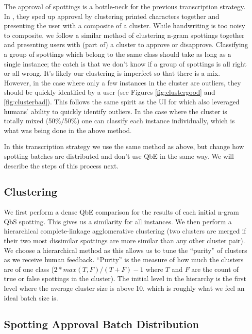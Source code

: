 \documentclass[ms,electronic,twosidetoc,letterpaper,chaptercenter,parttop,lof,lot]{byumsphd}
\begin{document}
The approval of spottings is a bottle-neck for the previous transcription strategy. In \cite{Retsinas2015}, they sped up approval by clustering printed characters together and presenting the user with a composite of a cluster. While handwriting is too noisy to composite, we follow a similar method of clustering n-gram spottings together and presenting users with (part of) a cluster to approve or disapprove. Classifying a group of spottings which belong to the same class should take as long as a single instance; the catch is that we don't know if a group of spottings is all right or all wrong. It's likely our clustering is imperfect so that there is a mix. However, in the case where only a few instances in the cluster are outliers, they should be quickly identified by a user (see Figures \ref{fig:clustergood} and \ref{fig:clusterbad}). This follows the same spirit as the UI for \cite{Clawson2014} which also leveraged humans' ability to quickly identify outliers. In the case where the cluster is totally mixed (50\%/50\%) one can classify each instance individually, which is what was being done in the above method.

In this transcription strategy we use the same method as above, but change how spotting batches are distributed and don't use QbE in the same way. We will describe the steps of this process next.

\subsection{Clustering}

We first perform a dense QbE comparison for the results of each initial n-gram QbS spotting. This gives us a similarity for all instances. We then perform a hierarchical complete-linkage agglomerative clustering (two clusters are merged if their two most dissimilar spottings are more similar than any other cluster pair). We choose a hierarchical method as this allows us to tune the ``purity'' of clusters as we receive human feedback. ``Purity'' is the measure of how much the clusters are of one class ($2*max(T,F)/(T+F)-1$ where $T$ and $F$ are the count of true or false spottings in the cluster). The initial level in the hierarchy is the first level where the average cluster size is above 10, which is roughly what we feel an ideal batch size is.





\subsection{Spotting Approval Batch Distribution}
\end{document}
